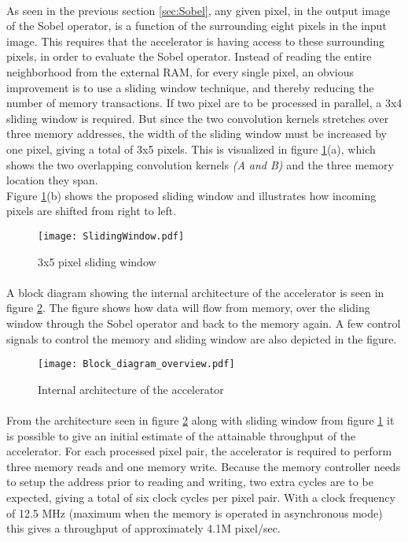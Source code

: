 \paragraph*{}
As seen in the previous section \ref{sec:Sobel}, any given pixel, in the output image of the Sobel operator, is a function of the surrounding eight pixels in the input image. This requires that the accelerator is having access to these surrounding pixels, in order to evaluate the Sobel operator. Instead of reading the entire neighborhood from the external RAM, for every single pixel, an obvious improvement is to use a sliding window technique, and thereby reducing the number of memory transactions. If two pixel are to be processed in parallel, a 3x4 sliding window is required. But since the two convolution kernels stretches over three memory addresses, the width of the sliding window must be increased by one pixel, giving a total of 3x5 pixels. This is visualized in figure \ref{fig:shift_register}(a), which shows the two overlapping convolution kernels \emph{(A and B)} and the three memory location they span. \\
Figure \ref{fig:shift_register}(b) shows the proposed sliding window and illustrates how incoming pixels are shifted from right to left.

\begin{figure}[H]
	\centering
	\texttt{[image: SlidingWindow.pdf]}
	\caption{3x5 pixel sliding window}
	\label{fig:shift_register}
\end{figure}

\paragraph*{}
A block diagram showing the internal architecture of the accelerator is seen in figure \ref{fig:AccBlockDiagram}. The figure shows how data will flow from memory, over the sliding window through the Sobel operator and back to the memory again. A few control signals to control the memory and sliding window are also depicted in the figure. 

\begin{figure}[H]
	\centering
	\texttt{[image: Block\_diagram\_overview.pdf]}
	\caption{Internal architecture of the accelerator}
	\label{fig:AccBlockDiagram}
\end{figure}

\paragraph*{}
From the architecture seen in figure \ref{fig:AccBlockDiagram} along with sliding window from figure \ref{fig:shift_register} it is possible to give an initial estimate of the attainable throughput of the accelerator. For each processed pixel pair, the accelerator is required to perform three memory reads and one memory write. Because the memory controller needs to setup the address prior to reading and writing, two extra cycles are to be expected, giving a total of six clock cycles per pixel pair.
With a clock frequency of 12.5 MHz (maximum when the memory is operated in asynchronous mode) this gives a throughput of approximately 4.1M pixel/sec.
